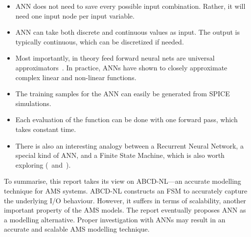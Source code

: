 \documentclass[a4paper]{article}
\begin{document}
\begin{itemize}
	\item ANN does not need to save every possible input combination. Rather, it will need one input node per input variable.  
	\item ANN can take both discrete and continuous values as input. The output is typically continuous, which can be discretized if needed. %
	\item Most importantly, in theory feed forward neural nets are universal approximators~\cite{ANN_UNI_APPX}. In practice, ANNs have shown to closely approximate complex linear and non-linear functions. 
	\item The training samples for the ANN can easily be generated from SPICE simulations. 
	\item Each evaluation of the function can be done with one forward pass, which takes constant time. %
	\item There is also an interesting analogy between a Recurrent Neural Network, a special kind of ANN, and a Finite State Machine, which is also worth exploring (\cite{RNN_FSM1}~and~\cite{RNN_FSM2}). 
	
\end{itemize}




To summarise, this report takes its view on ABCD-NL---an accurate modelling technique for AMS systems. ABCD-NL constructs an FSM to accurately capture the underlying I/O behaviour. However, it suffers in terms of scalability, another important property of the AMS models. The report eventually proposes ANN as a modelling alternative. Proper investigation with ANNs may result in an accurate and scalable AMS modelling technique.  





 

\end{document}
